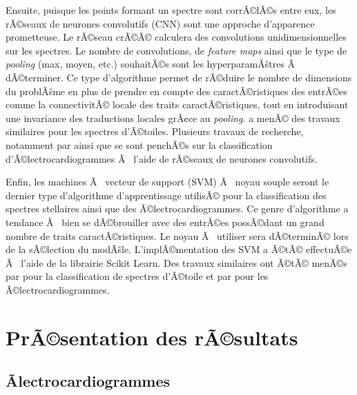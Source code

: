 \documentclass{article}
\begin{document}
Ensuite, puisque les points formant un spectre sont corrÃ©lÃ©s entre eux, les rÃ©seaux de neurones convolutifs (CNN) sont une approche d'apparence prometteuse. Le rÃ©seau crÃ©Ã© calculera des convolutions unidimensionnelles sur les spectres. Le nombre de convolutions, de \textit{feature maps} ainsi que le type de \textit{pooling} (max, moyen, etc.) souhaitÃ©s sont les hyperparamÃštres Ã  dÃ©terminer. Ce type d'algorithme permet de rÃ©duire le nombre de dimensions du problÃšme en plus de prendre en compte des caractÃ©ristiques des entrÃ©es comme la connectivitÃ© locale des traits caractÃ©ristiques, tout en introduisant une invariance des traductions locales grÃ¢ce au \textit{pooling}. \cite{hala2014spectral} a menÃ© des travaux similaires pour les spectres d'Ã©toiles. Plusieurs travaux de recherche, notamment par \cite{rajpurkar2017cardiologist} ainsi que \cite{zihlmann2017convolutional} se sont penchÃ©s sur la classification d'Ã©lectrocardiogrammes Ã  l'aide de rÃ©seaux de neurones convolutifs.

Enfin, les machines Ã  vecteur de support (SVM) Ã  noyau souple seront le dernier type d'algorithme d'apprentissage utilisÃ© pour la classification des spectres stellaires ainsi que des Ã©lectrocardiogrammes. Ce genre d'algorithme a tendance Ã  bien se dÃ©brouiller avec des entrÃ©es possÃ©dant un grand nombre de traits caractÃ©ristiques. Le noyau Ã  utiliser sera dÃ©terminÃ© lors de la sÃ©lection du modÃšle. L'implÃ©mentation des SVM a Ã©tÃ© effectuÃ©e Ã  l'aide de la librairie Scikit Learn. Des travaux similaires ont Ã©tÃ© menÃ©s par \cite{bu2014stellar} pour la classification de spectres d'Ã©toile et par \cite{shensheng2017deep} pour les Ã©lectrocardiogrammes.




\section{PrÃ©sentation des rÃ©sultats}\label{sec:results}

\subsection{Ãlectrocardiogrammes}
\end{document}
